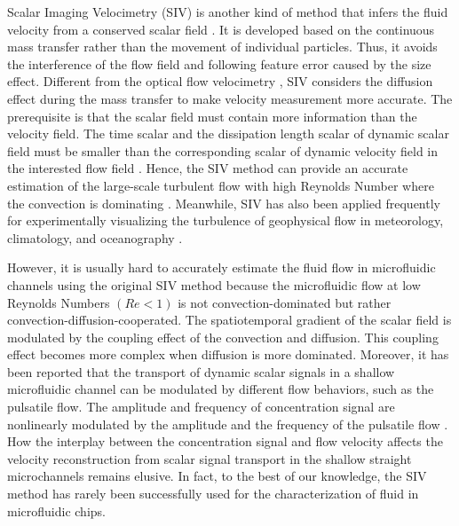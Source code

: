 \documentclass{article}
\begin{document}
Scalar Imaging Velocimetry (SIV) is another kind of method that infers the fluid velocity from a conserved scalar field \citep{su1996scalar1,su1996scalar2}. It is developed based on the continuous mass transfer rather than the movement of individual particles. Thus, it avoids the interference of the flow field and following feature error caused by the size effect. Different from the optical flow velocimetry \citep{chen2015optical,kucukal2021blood}, SIV considers the diffusion effect during the mass transfer to make velocity measurement more accurate. The prerequisite is that the scalar field must contain more information than the velocity field. The time scalar and the dissipation length scalar of dynamic scalar field must be smaller than the corresponding scalar of dynamic velocity field in the interested flow field \citep{gillissen2018space}. Hence, the SIV method can provide an accurate estimation of the large-scale turbulent flow with high Reynolds Number where the convection is dominating \citep{gillissen2018space,heitz2010variational}. Meanwhile, SIV has also been applied frequently for experimentally visualizing the turbulence of geophysical flow in meteorology, climatology, and oceanography \citep{kalnay2003atmospheric,papadakis2008variational}.\par
However, it is usually hard to accurately estimate the fluid flow in microfluidic channels using the original SIV method because the microfluidic flow at low Reynolds Numbers $(Re<1)$ is not convection-dominated but rather convection-diffusion-cooperated. The spatiotemporal gradient of the scalar field is modulated by the coupling effect of the convection and diffusion. This coupling effect becomes more complex when diffusion is more dominated. Moreover, it has been reported \citep{li2013transport,chen2016shaped} that the transport of dynamic scalar signals in a shallow microfluidic channel can be modulated by different flow behaviors, such as the pulsatile flow. The amplitude and frequency of concentration signal are nonlinearly modulated by the amplitude and the frequency of the pulsatile flow \citep{li2018transmission}. How the interplay between the concentration signal and flow velocity affects the velocity reconstruction from scalar signal transport in the shallow straight microchannels remains elusive. In fact, to the best of our knowledge, the SIV method has rarely been successfully used for the characterization of fluid in microfluidic chips.\par
\end{document}

